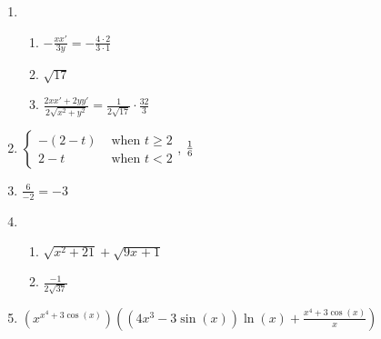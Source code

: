 \documentclass[12pt,twoside]{article}
\makeatletter
\def\emptycleardoublepage{\clearpage\if@twoside \ifodd\c@page\else
\thispagestyle{empty}%
\hbox{}\newpage\if@twocolumn\hbox{}\newpage\fi\fi\fi}
\makeatother
\begin{document}
\begin{multicols}{2}
\begin{enumerate}
\def \b{3}\def \x{4}\def \y{1}\def \xchange{2}\def \ratrhs{4}\def \cirrhs{19}\def \hyprhs{13}\def \compy{3y^{2}}\def \ychangenum{2}\def \dist{17}\def \fracrat{15}\def \fraccirc{\frac{32}{3}}\def \frachyp{\frac{64}{3}}
\item \begin{enumerate}
\item $-\frac{xx'}{\b y} = -\frac{\x \cdot \xchange}{\b \cdot \y}$
\item $\sqrt{\dist}$
\item $\frac{2xx'+2yy'}{2\sqrt{x^2+y^2}} = \frac{1}{2\sqrt{\dist}} \cdot \fraccirc$
\end{enumerate}
\def \a{2}\def \k{6}\def \abstop{1}\def \ktop{0}
\item $\begin{cases} -(\a -t) & \text{ when } t \geq \a \\ \a-t & \text{ when } t < \a \end{cases}$, $\ifthenelse{\ktop=1}{\k}{\frac{1}{\k}}$
\def \a{1}\def \b{3}\def \k{6}\def \fancyp{x^{2}-4x^{}+3}\def \simplep{6x^{}-6}\def \fancyreduced{-2}\def \niceanstop{\frac{-1}{3}}\def \niceansbottom{-3}
\item $\frac{\k}{\fancyreduced} = \niceansbottom$
\def \a{4}\def \b{5}\def \ab{20}\def \c{21}\def \amb{-1}\def \ansroot{37}\def \firstroot{x^{2}+21}\def \secondroot{9x^{}+1}\def \porm{1}
\item \begin{enumerate}
\item $\sqrt{\firstroot} + \sqrt{\secondroot}$
\item $\frac{\amb}{2\sqrt{\ansroot}}$
\end{enumerate}
\def \varexp{4}\def \newexp{3}\def \trigcoeff{3}\def \trigval{+3}\def \oppval{-3}
\item $(x^{x^\varexp \trigval \cos(x)}) \left( (\varexp x^{\newexp} \oppval \sin(x))\ln(x) + \frac{x^\varexp \trigval \cos(x)}{x} \right)$
 \end{enumerate}\end{multicols}\emptycleardoublepage{}\graphicspath{{C:/Users/iainc/anaconda3/Randomizer/MATH 1001/Midterm 1/}}\begin{multicols}{2} \begin{enumerate}\def \a{4}\def \b{9}\def \c{-7}\def \d{4}\def \negb{-9}\def \negc{7}\def \determ{79}\def \ansa{\frac{4}{79}}\def \ansb{\frac{-9}{79}}\def \ansc{\frac{7}{79}}\def \ansd{\frac{4}{79}}

\end{enumerate}
\end{multicols}
\end{document}
